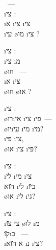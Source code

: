 
\begin{twocol}
\begin{stanza}
~—\\
\i{צי}  :\\
\i{א} \i{צי} \i{צי}\\
\i{עי} \o{מו} \i{צי} ?
\end{stanza}

\begin{stanza}
\i{צי}  :\\
\i{צי} \i{מ} \\
\o{חו} ~—\\
\i{א}  \i{צי} \\
\o{חו} \o{או} ?
\end{stanza}

\begin{stanza}
\i{צי}  :\\
\o{רו}\i{אי} \i{צי}  \i{פי}~—\\
 \o{יו}\i{עי} \i{מי}   \i{מי}?\\
\i{פּי}  \i{צי},\\
\o{או} \i{צי}  \i{פּי}?
\end{stanza}

\begin{stanza}
\i{צי}  :\\
\i{לי}  \i{מי} \i{צי}\\
\u{הוא} \i{לי}  \i{ב}\u{יו}\\
\o{או} \i{לי} \i{גי}?
\end{stanza}

\begin{stanza}
\i{צי}  :\\
\i{צי} \u{צו} \o{לו} \i{מ}\\
\u{קו}\i{בּ} ~—\\
\i{א} \u{הוא} \i{נ} \i{צי}?
\end{stanza}


\end{twocol}
